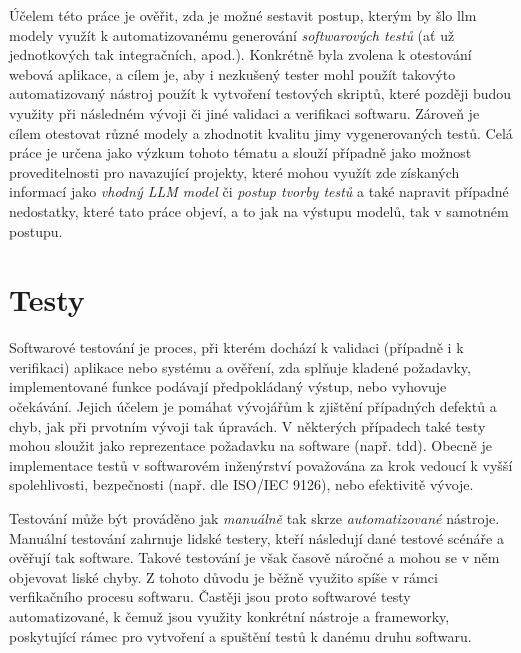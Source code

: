 \documentclass[czech, ma, kiv, he, iso690numb, pdf, viewonly]{fasthesis}
\begin{document}
    Účelem této práce je ověřit, zda je možné sestavit postup, kterým by šlo \Gls{llm} modely využít k automatizovanému generování \textit{softwarových testů} (ať už jednotkových tak integračních, apod.). Konkrétně byla zvolena k otestování webová aplikace, a cílem je, aby i nezkušený tester mohl použít takovýto automatizovaný nástroj použít k vytvoření testových skriptů, které později budou využity při následném vývoji či jiné validaci a verifikaci softwaru. Zároveň je cílem otestovat různé modely a zhodnotit kvalitu jimy vygenerovaných testů. Celá práce je určena jako výzkum tohoto tématu a slouží případně jako možnost proveditelnosti pro navazující projekty, které mohou využít zde získaných informací jako \textit{vhodný LLM model} či \textit{postup tvorby testů} a také napravit případné nedostatky, které tato práce objeví, a to jak na výstupu modelů, tak v samotném postupu.
    
    \section{Testy}

    Softwarové testování je proces, při kterém dochází k validaci (případně i k verifikaci) aplikace nebo systému a ověření, zda splňuje kladené požadavky, implementované funkce podávají předpokládaný výstup, nebo vyhovuje očekávání. Jejich účelem je pomáhat vývojářům k zjištění případných defektů a chyb, jak při prvotním vývoji tak úpravách. V některých případech také testy mohou sloužit jako reprezentace požadavku na software (např. \Acrshort{tdd}). Obecně je implementace testů v softwarovém inženýrství považována za krok vedoucí k vyšší spolehlivosti, bezpečnosti (např. dle ISO/IEC 9126), nebo efektivitě vývoje.

    Testování může být prováděno jak \textit{manuálně} tak skrze \textit{automatizované} nástroje. Manuální testování zahrnuje lidské testery, kteří následují dané testové scénáře a ověřují tak software. Takové testování je však časově náročné a mohou se v něm objevovat liské chyby. Z tohoto důvodu je běžně využito spíše v rámci verfikačního procesu softwaru. Častěji jsou proto softwarové testy automatizované, k čemuž jsou využity konkrétní nástroje a frameworky, poskytující rámec pro vytvoření a spuštění testů k danému druhu softwaru. \cite{geeksforgeeks2023testingtypes}
\end{document}
